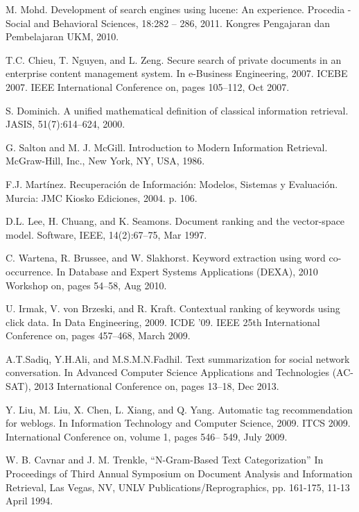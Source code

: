\documentclass[runningheads,a4paper]{llncs}
\theoremstyle{break}
\begin{document}
\begin{thebibliography}{5}
M. Mohd. Development of search engines using lucene: An experience. Procedia - Social and Behavioral Sciences, 18:282 – 286, 2011. Kongres Pengajaran dan Pembelajaran UKM, 2010.

T.C. Chieu, T. Nguyen, and L. Zeng. Secure search of private documents in an enterprise content management system. In e-Business Engineering, 2007. ICEBE 2007. IEEE International Conference on, pages 105–112, Oct 2007.

S. Dominich. A unified mathematical definition of classical information retrieval. JASIS, 51(7):614–624, 2000.

G. Salton and M. J. McGill. Introduction to Modern Information Retrieval. McGraw-Hill, Inc., New York, NY, USA, 1986.

F.J. Martínez. Recuperación de Información: Modelos, Sistemas y Evaluación. Murcia: JMC Kiosko Ediciones, 2004. p. 106.


D.L. Lee, H. Chuang, and K. Seamons. Document ranking and the vector-space model. Software, IEEE, 14(2):67–75, Mar 1997.

C. Wartena, R. Brussee, and W. Slakhorst. Keyword extraction using word co-occurrence. In Database and Expert Systems Applications (DEXA), 2010 Workshop on, pages 54–58, Aug 2010.

U. Irmak, V. von Brzeski, and R. Kraft. Contextual ranking of keywords using click data. In Data Engineering, 2009. ICDE ’09. IEEE 25th International Conference on, pages 457–468, March 2009.

A.T.Sadiq, Y.H.Ali, and M.S.M.N.Fadhil. Text summarization for social network conversation. In Advanced Computer Science Applications and Technologies (AC-SAT), 2013 International Conference on, pages 13–18, Dec 2013.

Y. Liu, M. Liu, X. Chen, L. Xiang, and Q. Yang. Automatic tag recommendation for weblogs. In Information Technology and Computer Science, 2009. ITCS 2009. International Conference on, volume 1, pages 546– 549, July 2009.

W. B. Cavnar and J. M. Trenkle, ``N-Gram-Based Text Categorization''
In Proceedings of Third Annual Symposium on Document Analysis and
Information Retrieval, Las Vegas, NV, UNLV Publications/Reprographics,
pp. 161-175, 11-13 April 1994.



\end{thebibliography}
\end{document}
